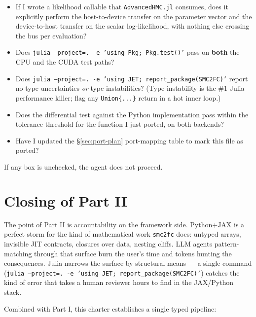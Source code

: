 \documentclass[11pt,a4paper]{article}
\begin{document}
\begin{itemize}
  CPU (\texttt{Array} fields), and is the only host--device
  transfer the scalar log-likelihood (or the small parameter
  vector going the other way)?
\item[$\square$] If I wrote a likelihood callable that
  \texttt{AdvancedHMC.jl} consumes, does it explicitly perform
  the host-to-device transfer on the parameter vector and the
  device-to-host transfer on the scalar log-likelihood, with
  nothing else crossing the bus per evaluation?
\item[$\square$] Does
  \texttt{julia --project=. -e 'using Pkg; Pkg.test()'} pass on
  \textbf{both} the CPU and the CUDA test paths?
\item[$\square$] Does
  \texttt{julia --project=. -e 'using JET; report\_package(SMC2FC)'}
  report no type uncertainties \emph{or} type instabilities?
  (Type instability is the \#1 Julia performance killer; flag
  any \texttt{Union\{...\}} return in a hot inner loop.)
\item[$\square$] Does the differential test against the Python
  implementation pass within the tolerance threshold for the
  function I just ported, on both backends?
\item[$\square$] Have I updated the §\ref{sec:port-plan} port-mapping
  table to mark this file as ported?
\end{itemize}

If any box is unchecked, the agent does not proceed.

\section{Closing of Part II}

The point of Part II is accountability on the framework side.
Python+JAX is a perfect storm for the kind of mathematical work
\texttt{smc2fc} does: untyped arrays, invisible JIT contracts,
closures over data, nesting cliffs. LLM agents pattern-matching
through that surface burn the user's time and tokens hunting the
consequences. Julia narrows the surface by structural means --- a
single command (\texttt{julia --project=. -e 'using JET;
report\_package(SMC2FC)'}) catches the kind of error that takes a
human reviewer hours to find in the JAX/Python stack.

Combined with Part I, this charter establishes a single typed
pipeline:

\begin{center}
\end{center}
\end{document}
